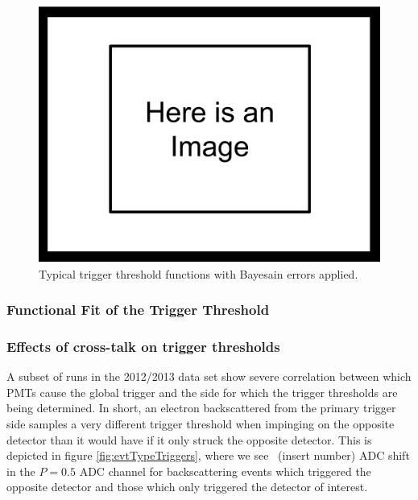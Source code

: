 \begin{figure}[h] \label{fig:trigger_thresh}
\centering
\includegraphics[scale=.25]{3-UCNAAnalysis/ImageHolder.pdf}
\caption{Typical trigger threshold functions with Bayesain errors 
applied. }
\end{figure}

\subsubsection{Functional Fit of the Trigger Threshold}

\subsubsection{Effects of cross-talk on trigger thresholds}

A subset of runs in the 2012/2013 data set show severe correlation between 
which PMTs cause the global trigger and the side for which the trigger thresholds 
are being determined. In short, an electron backscattered from the primary trigger
side samples a very different trigger threshold when impinging on the opposite detector 
than it would have if it only struck the opposite detector. This is depicted 
in figure \ref{fig:evtTypeTriggers}, where we see ~(insert number)
ADC shift in the $P=0.5$ ADC channel for backscattering events which triggered the
opposite detector and those which only triggered the detector of interest.


